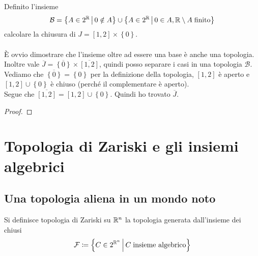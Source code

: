 \begin{example}
	Definito l'insieme $$\mathcal{B} = \left\{A \in 2^{\mathbb{R}} \,\middle|\, 0 \notin A \right\} \cup \left\{ A \in 2^{\mathbb{R}} \,\middle|\, 0 \in A, \mathbb{R} \setminus A \; \text{finito} \right\}$$ calcolare la chiusura di $J = \left[1,2\right] \times \left\{0\right\}$. \\ \\
	È ovvio dimostrare che l'insieme oltre ad essere una base è anche una topologia. \\ Inoltre vale $\overline{J} = \overline{\left\{0\right\}} \times \overline{\left[1,2\right]}$, quindi posso separare i casi in una topologia $\mathcal{B}$. Vediamo che $\overline{\left\{0\right\}} = \left\{0\right\}$ per la definizione della topologia, $\left[1,2\right]$ è aperto e $\left[1,2\right] \cup \left\{0\right\}$ è chiuso (perché il complementare è aperto). \\ Segue che $\overline{\left[1,2\right]} = \left[1,2\right] \cup \left\{0\right\}$. Quindi ho trovato $\overline{J}$.
\end{example}
\begin{proof}
	
\end{proof}



\section{Topologia di Zariski e gli insiemi algebrici}
\subsection{\textcolor{TopGener}{\textbf{Una topologia aliena in un mondo noto}}}



\begin{definition}
	Si definisce topologia di Zariski su $\mathbb{R}^n$ la topologia generata dall'insieme dei chiusi 
	\begin{equation*}
	\mathcal{F} \coloneqq \left\{ C \in 2^{\mathbb{R}^n} \,\middle|\, C \; \text{insieme algebrico} \right\}
	\end{equation*}
\end{definition}

